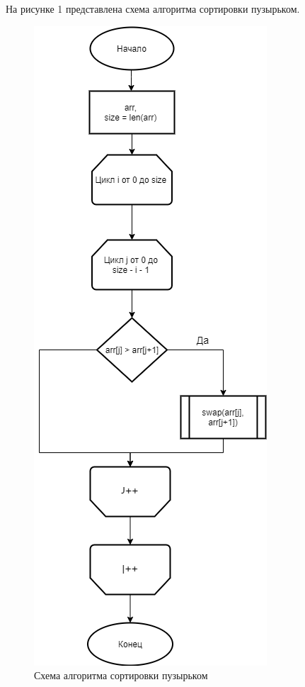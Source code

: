 \documentclass[a4paper,12pt]{article}
\begin{document}
	На рисунке 1 представлена схема алгоритма сортировки пузырьком.
	\begin{figure}[H]
		\centering
		\includegraphics[scale=1.6]{bubble.png}
		\captionsetup{justification=centering}
		\caption{Схема алгоритма сортировки пузырьком}
		\label{Рис 1}
	\end{figure}
\end{document}
